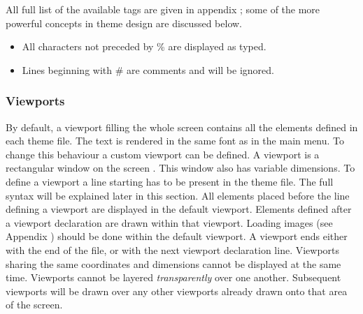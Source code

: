 All full list of the available tags are given in appendix
; some of the more powerful concepts in theme design
are discussed below.

\begin{itemize}
\item All characters not preceded by \% are displayed as typed.
\item Lines beginning with \# are comments and will be ignored.
\end{itemize}


\subsubsection{\label{ref:Viewports}Viewports}

By default, a viewport filling the whole screen contains all the elements
defined in each theme file. The
text is rendered in the
same font as in the main menu. To change this behaviour a custom viewport can
be defined. A viewport is a rectangular window on the screen%
.
This window also has variable dimensions. To
define a viewport a line starting  has to be
present in the theme file. The full syntax will be explained later in
this section. All elements placed before the
line defining a viewport are displayed in the default viewport. Elements
defined after a viewport declaration are drawn within that viewport.
Loading images (see Appendix )
should be done within the default viewport.
A viewport ends either with the end of the file, or with the next viewport
declaration line. Viewports sharing the same
coordinates and dimensions cannot be displayed at the same time. Viewports
cannot be layered \emph{transparently} over one another. Subsequent viewports
will be drawn over any other viewports already drawn onto that
area of the screen.


